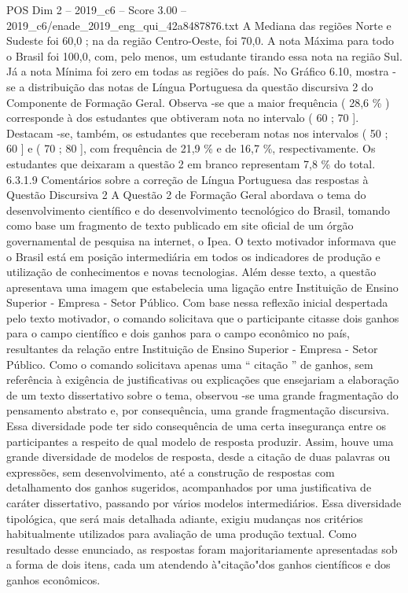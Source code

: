\begin{textsample}{POS Dim 2 – 2019\_c6 – Score 3.00 – 2019\_c6/enade\_2019\_eng\_qui\_42a8487876.txt}
A Mediana das regiões Norte e Sudeste foi 60,0 ; na da região Centro-Oeste, foi 70,0.
A nota Máxima para todo o Brasil foi 100,0, com, pelo menos, um estudante tirando essa nota na região Sul.
Já a nota Mínima foi zero em todas as regiões do país.
No Gráfico 6.10, mostra -se a distribuição das notas de Língua Portuguesa da questão discursiva 2 do Componente de Formação Geral.
Observa -se que a maior frequência ( 28,6 \% ) corresponde à dos estudantes que obtiveram nota no intervalo ( 60 ; 70 ].
Destacam -se, também, os estudantes que receberam notas nos intervalos ( 50 ; 60 ] e ( 70 ; 80 ], com frequência de 21,9 \% e de 16,7 \%, respectivamente.
Os estudantes que deixaram a questão 2 em branco representam 7,8 \% do total. 6.3.1.9 Comentários sobre a correção de Língua Portuguesa das respostas à Questão Discursiva 2 A Questão 2 de Formação Geral abordava o tema do desenvolvimento científico e do desenvolvimento tecnológico do Brasil, tomando como base um fragmento de texto publicado em site oficial de um órgão governamental de pesquisa na internet, o Ipea.
O texto motivador informava que o Brasil está em posição intermediária em todos os indicadores de produção e utilização de conhecimentos e novas tecnologias.
Além desse texto, a questão apresentava uma imagem que estabelecia uma ligação entre Instituição de Ensino Superior - Empresa - Setor Público.
Com base nessa reflexão inicial despertada pelo texto motivador, o comando solicitava que o participante citasse dois ganhos para o campo científico e dois ganhos para o campo econômico no país, resultantes da relação entre Instituição de Ensino Superior - Empresa - Setor Público.
Como o comando solicitava apenas uma “ citação ” de ganhos, sem referência à exigência de justificativas ou explicações que ensejariam a elaboração de um texto dissertativo sobre o tema, observou -se uma grande fragmentação do pensamento abstrato e, por consequência, uma grande fragmentação discursiva.
Essa diversidade pode ter sido consequência de uma certa insegurança entre os participantes a respeito de qual modelo de resposta produzir.
Assim, houve uma grande diversidade de modelos de resposta, desde a citação de duas palavras ou expressões, sem desenvolvimento, até a construção de respostas com detalhamento dos ganhos sugeridos, acompanhados por uma justificativa de caráter dissertativo, passando por vários modelos intermediários.
Essa diversidade tipológica, que será mais detalhada adiante, exigiu mudanças nos critérios habitualmente utilizados para avaliação de uma produção textual.
Como resultado desse enunciado, as respostas foram majoritariamente apresentadas sob a forma de dois itens, cada um atendendo à"citação"dos ganhos científicos e dos ganhos econômicos.

\end{textsample}
